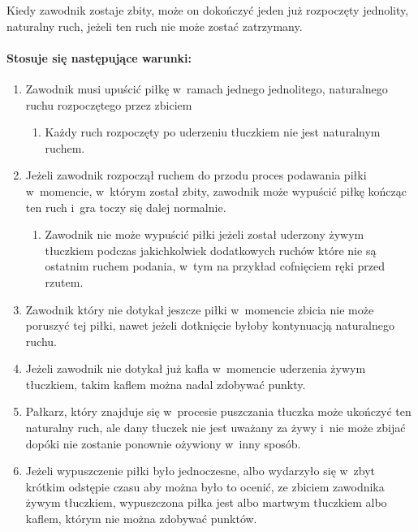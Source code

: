 \documentclass[12pt,a4paper]{article}
\begin{document}
Kiedy zawodnik zostaje zbity, może on dokończyć jeden już rozpoczęty
jednolity, naturalny ruch, jeżeli ten ruch nie może zostać zatrzymany.

\paragraph{Stosuje się następujące warunki:}

\begin{enumerate}
	\item
	      Zawodnik musi upuścić piłkę w~ramach jednego jednolitego, naturalnego
	      ruchu rozpoczętego przez zbiciem

	      \begin{enumerate}
		      \item
		            Każdy ruch rozpoczęty po uderzeniu tłuczkiem nie jest naturalnym
		            ruchem.
	      \end{enumerate}
	\item
	      Jeżeli zawodnik rozpoczął ruchem do przodu proces podawania piłki w~momencie, w~którym został zbity, zawodnik może wypuścić piłkę kończąc
	      ten ruch i~gra toczy się dalej normalnie.

	      \begin{enumerate}
		      \item
		            Zawodnik nie może wypuścić piłki jeżeli został uderzony żywym tłuczkiem
		            podczas jakichkolwiek dodatkowych ruchów które nie są ostatnim
		            ruchem podania, w~tym na przykład cofnięciem ręki przed rzutem.
	      \end{enumerate}
	\item
	      Zawodnik który nie dotykał jeszcze piłki w~momencie zbicia nie może
	      poruszyć tej piłki, nawet jeżeli dotknięcie byłoby kontynuacją
	      naturalnego ruchu.
	\item
	      Jeżeli zawodnik nie dotykał już kafla w~momencie uderzenia żywym
	      tłuczkiem, takim kaflem można nadal zdobywać punkty.
	\item
	      Pałkarz, który znajduje się w~procesie puszczania tłuczka może
	      ukończyć ten naturalny ruch, ale dany tłuczek nie jest uważany za żywy
	      i~nie może zbijać dopóki nie zostanie ponownie ożywiony w~inny sposób.
	\item
	      Jeżeli wypuszczenie piłki było jednoczesne, albo wydarzyło się w~zbyt
	      krótkim odstępie czasu aby można było to ocenić, ze zbiciem zawodnika
	      żywym tłuczkiem, wypuszczona piłka jest albo martwym tłuczkiem albo
	      kaflem, którym nie można zdobywać punktów.
\end{enumerate}
\end{document}
